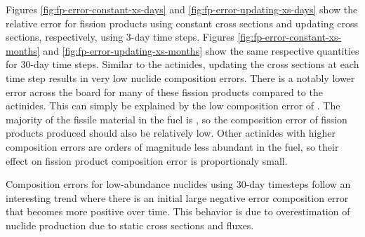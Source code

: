     Figures \ref{fig:fp-error-constant-xs-days} and
    \ref{fig:fp-error-updating-xs-days} show the relative error for fission
    products using constant cross sections and updating cross sections,
    respectively, using 3-day time steps. Figures
    \ref{fig:fp-error-constant-xs-months} and
    \ref{fig:fp-error-updating-xs-months} show the same respective quantities
    for 30-day time steps. Similar to the actinides, updating the cross sections
    at each time step results in very low nuclide composition errors. There is a
    notably lower error across the board for many of these fission products
    compared to the actinides. This can simply be explained by the low
    composition error of . The majority of the fissile material in
    the fuel is , so the composition error of fission products
    produced should also be relatively low. Other actinides with higher
    composition errors are orders of magnitude less abundant in the fuel, so
    their effect on fission product composition error is proportionaly small.

    Composition errors for low-abundance nuclides using 30-day timesteps follow
    an interesting trend where there is an initial large negative error
    composition error that becomes more positive over time. This behavior is due
    to overestimation of nuclide production due to static cross sections and
    fluxes.

